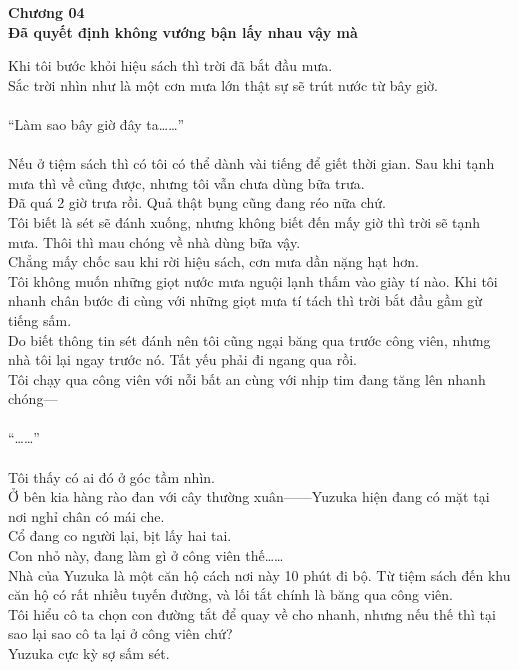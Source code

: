 \documentclass[12pt,a4paper, twosides]{book}
\begin{document}
    \begin{center}
    \textbf{\large Chương 04 \\ Đã quyết định không vướng bận lấy nhau vậy mà}
    \end{center}
    \noindent
Khi tôi bước khỏi hiệu sách thì trời đã bắt đầu mưa.\\
Sắc trời nhìn như là một cơn mưa lớn thật sự sẽ trút nước từ bây giờ.\\
\\
“Làm sao bây giờ đây ta……”\\
\\
Nếu ở tiệm sách thì có tôi có thể dành vài tiếng để giết thời gian. Sau khi tạnh mưa thì về cũng được, nhưng tôi vẫn chưa dùng bữa trưa.\\
Đã quá 2 giờ trưa rồi. Quả thật bụng cũng đang réo nữa chứ.\\
Tôi biết là sét sẽ đánh xuống, nhưng không biết đến mấy giờ thì trời sẽ tạnh mưa. Thôi thì mau chóng về nhà dùng bữa vậy.\\
Chẳng mấy chốc sau khi rời hiệu sách, cơn mưa dần nặng hạt hơn.\\
Tôi không muốn những giọt nước mưa nguội lạnh thấm vào giày tí nào. Khi tôi nhanh chân bước đi cùng với những giọt mưa tí tách thì trời bắt đầu gầm gừ tiếng sấm.\\
Do biết thông tin sét đánh nên tôi cũng ngại băng qua trước công viên, nhưng nhà tôi lại ngay trước nó. Tất yếu phải đi ngang qua rồi.\\
Tôi chạy qua công viên với nỗi bất an cùng với nhịp tim đang tăng lên nhanh chóng—\\
\\
“……”\\
\\
Tôi thấy có ai đó ở góc tầm nhìn.\\
Ở bên kia hàng rào đan với cây thường xuân——Yuzuka hiện đang có mặt tại nơi nghỉ chân có mái che.\\
Cổ đang co người lại, bịt lấy hai tai.\\
Con nhỏ này, đang làm gì ở công viên thế……\\
Nhà của Yuzuka là một căn hộ cách nơi này 10 phút đi bộ. Từ tiệm sách đến khu căn hộ có rất nhiều tuyến đường, và lối tắt chính là băng qua công viên.\\
Tôi hiểu cô ta chọn con đường tắt để quay về cho nhanh, nhưng nếu thế thì tại sao lại sao cô ta lại ở công viên chứ?\\
Yuzuka cực kỳ sợ sấm sét.\\
\end{document}
